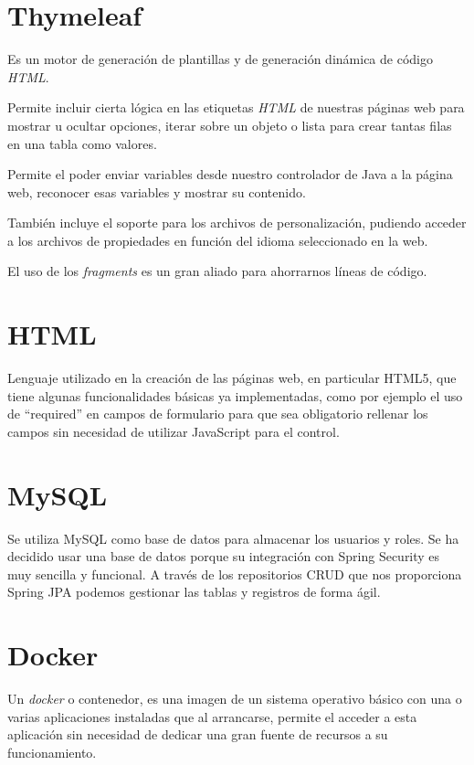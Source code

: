 \section{Thymeleaf}

Es un motor de generación de plantillas y de generación dinámica de código \textit{HTML}.

Permite incluir cierta lógica en las etiquetas \textit{HTML} de nuestras páginas web para mostrar u ocultar opciones, iterar sobre un objeto o lista para crear tantas filas en una tabla como valores.

Permite el poder enviar variables desde nuestro controlador de Java a la página web, reconocer esas variables y mostrar su contenido.

También incluye el soporte para los archivos de personalización, pudiendo acceder a los archivos de propiedades en función del idioma seleccionado en la web.

El uso de los \textit{fragments} es un gran aliado para ahorrarnos líneas de código.

\section{HTML}

Lenguaje utilizado en la creación de las páginas web, en particular HTML5, que tiene algunas funcionalidades básicas ya implementadas, como por ejemplo el uso de ``required'' en campos de formulario para que sea obligatorio rellenar los campos sin necesidad de utilizar JavaScript para el control.

\section{MySQL}

Se utiliza MySQL como base de datos para almacenar los usuarios y roles.
Se ha decidido usar una base de datos porque su integración con Spring Security es muy sencilla y funcional. 
A través de los repositorios CRUD que nos proporciona Spring JPA podemos gestionar las tablas y registros de forma ágil.

\section{Docker}

Un \textit{docker} o contenedor, es una imagen de un sistema operativo básico con una o varias aplicaciones instaladas que al arrancarse, permite el acceder a esta aplicación sin necesidad de dedicar una gran fuente de recursos a su funcionamiento.


